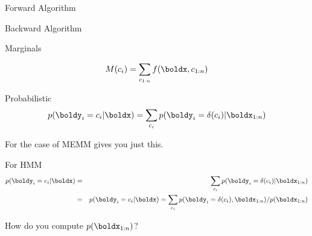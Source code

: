 \begin{frame}{Forward Algorithm}
  \begin{algorithmic}
    \EndFor{}
    \EndFor{}
    \EndProcedure{}
  \end{algorithmic}
\end{frame}


\begin{frame}{Backward Algorithm}
  \begin{algorithmic}
    \EndFor{}
    \EndFor{}
    \EndProcedure{}
  \end{algorithmic}
\end{frame}





\begin{frame}{Marginals}

  \[M(c_i) =  \sum_{c_{1:n}} f(\boldx, c_{1:n}) \] 
  

\end{frame}


\begin{frame}{Probabilistic }
  \[ p(\boldy_i = c_i | \boldx) = \sum_{c_i} p( \boldy_i = \delta(c_i) | \boldx_{1:n})  \] 

  For the case of MEMM gives you just this. 


  For HMM
  \begin{eqnarray*}
     p(\boldy_i = c_i | \boldx) &=& \sum_{c_i} p( \boldy_i = \delta(c_i) | \boldx_{1:n})  \\
     &= & p(\boldy_i = c_i | \boldx) = \sum_{c_i} p( \boldy_i = \delta(c_i), \boldx_{1:n}) / p(\boldx_{1:n})   
  \end{eqnarray*}

  How do you compute $p(\boldx_{1:n})$?
  

\end{frame}

